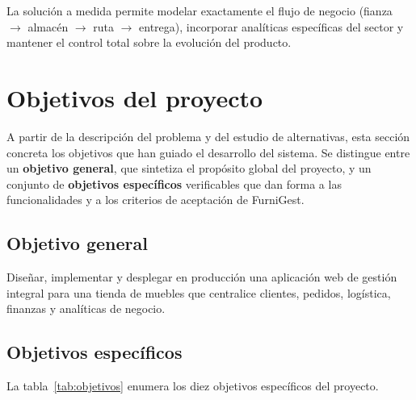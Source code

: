 \documentclass[12pt,twoside,titlepage]{report}
\begin{document}
La solución a medida permite modelar exactamente el flujo de negocio (fianza $\to$ almacén $\to$ ruta $\to$ entrega), incorporar analíticas específicas del sector y mantener el control total sobre la evolución del producto.

\section{Objetivos del proyecto}

A partir de la descripción del problema y del estudio de alternativas, esta sección concreta los objetivos que han guiado el desarrollo del sistema. Se distingue entre un \textbf{objetivo general}, que sintetiza el propósito global del proyecto, y un conjunto de \textbf{objetivos específicos} verificables que dan forma a las funcionalidades y a los criterios de aceptación de FurniGest.

\subsection{Objetivo general}

Diseñar, implementar y desplegar en producción una aplicación web de gestión integral para una tienda de muebles que centralice clientes, pedidos, logística, finanzas y analíticas de negocio.

\subsection{Objetivos específicos}

La tabla~\ref{tab:objetivos} enumera los diez objetivos específicos del proyecto.
\end{document}
